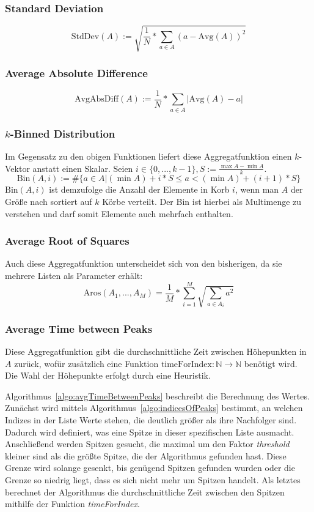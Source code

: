 \subsubsection{Standard Deviation}
\[
\text{StdDev}(A) := \sqrt{\frac{1}{N} * \sum_{a \in A} (a - \text{Avg}(A))^2}
\]
\subsubsection{Average Absolute Difference}
\[
\text{AvgAbsDiff}(A) := \frac{1}{N} * \sum_{a \in A} |\text{Avg}(A) - a|
\]
\subsubsection{$k$-Binned Distribution}
Im Gegensatz zu den obigen Funktionen liefert diese Aggregatfunktion einen $k$-Vektor anstatt einen Skalar. Seien $i \in \{0, ..., k - 1\}, S := \frac{\max A - \min A}{k}$.
\[
\text{Bin}(A, i) := \#\{a \in A | (\min A) + i * S \leq a < (\min A) + (i + 1) * S\}
\]
$\text{Bin}(A, i)$ ist demzufolge die Anzahl der Elemente in Korb $i$, wenn man $A$ der Größe nach sortiert auf $k$ Körbe verteilt. Der Bin ist hierbei als Multimenge zu verstehen und darf somit Elemente auch mehrfach enthalten.
\subsubsection{Average Root of Squares}
Auch diese Aggregatfunktion unterscheidet sich von den bisherigen, da sie mehrere Listen als Parameter erhält:
\[
\text{Aros}(A_1, ..., A_M) = \frac{1}{M} * \sum_{i = 1}^{M} \sqrt{\sum_{a \in A_i} a^2}
\]
\subsubsection{Average Time between Peaks}
Diese Aggregatfunktion gibt die durchschnittliche Zeit zwischen Höhepunkten in $A$ zurück, wofür zusätzlich eine Funktion $\text{timeForIndex}: \mathbb{N} \to \mathbb{N}$ benötigt wird. Die Wahl der Höhepunkte erfolgt durch eine Heuristik. 

Algorithmus~\ref{algo:avgTimeBetweenPeaks} beschreibt die Berechnung des Wertes. Zunächst wird mittels Algorithmus~\ref{algo:indicesOfPeaks} bestimmt, an welchen Indizes in der Liste Werte stehen, die deutlich größer als ihre Nachfolger sind. Dadurch wird definiert, was eine Spitze in dieser spezifischen Liste ausmacht. Anschließend werden Spitzen gesucht, die maximal um den Faktor \textit{threshold} kleiner sind als die größte Spitze, die der Algorithmus gefunden hast. Diese Grenze wird solange gesenkt, bis genügend Spitzen gefunden wurden oder die Grenze so niedrig liegt, dass es sich nicht mehr um Spitzen handelt. Als letztes berechnet der Algorithmus die durchschnittliche Zeit zwischen den Spitzen mithilfe der Funktion \textit{timeForIndex}.

